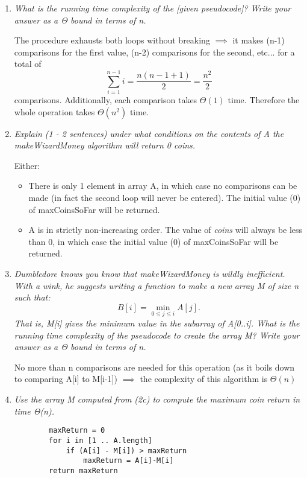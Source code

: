 \documentclass[12pt]{article}
\begin{document}
\begin{enumerate}
	\begin{enumerate}

		\item \textit{What is the running time complexity of the [given pseudocode]? Write your answer
as a Θ bound in terms of n.}


		The procedure exhausts both loops without breaking $\implies$ it makes (n-1) comparisons for the first value, (n-2) comparisons for the second, etc... for a total of $$\sum_{i=1}^{n-1} i = \frac{n(n-1+1)}{2} = \frac{n^2}{2}$$ comparisons. Additionally, each comparison takes $\Theta(1)$ time. Therefore the whole operation takes $\Theta(n^2)$ time.



		\item \textit{Explain (1 - 2 sentences) under what conditions on the contents of A the makeWizardMoney
algorithm will return 0 coins.}

		
		Either: 
		\begin{itemize}
			\item There is only 1 element in array A, in which case no comparisons can be made (in fact the second loop will never be entered). The initial value (0) of maxCoinsSoFar will be returned.
			\item A is in strictly non-increasing order. The value of \textit{coins} will always be less than 0, in which case the initial value (0) of maxCoinsSoFar will be returned.
		\end{itemize}


		\item \textit{Dumbledore knows you know that makeWizardMoney is wildly inefficient. With a wink, he suggests writing a function to make a new array M of size n such that:
				$$B[i] = \min_{0 \leq j \leq i} A[j] .$$
				That is, M[i] gives the minimum value in the subarray of A[0..i]. What is the running time complexity of the pseudocode to create the array M? Write your answer as a Θ bound in terms of n.}

		
		No more than n comparisons are needed for this operation (as it boils down to comparing A[i] to M[i-1]) $\implies$ the complexity of this algorithm is $\Theta(n)$


		\item \textit{Use the array M computed from (2c) to compute the maximum coin return in time Θ(n).}

		\begin{verbatim}
		maxReturn = 0
		for i in [1 .. A.length]
			if (A[i] - M[i]) > maxReturn
				maxReturn = A[i]-M[i]
		return maxReturn
		\end{verbatim}



\end{enumerate}
\end{enumerate}
\end{document}
